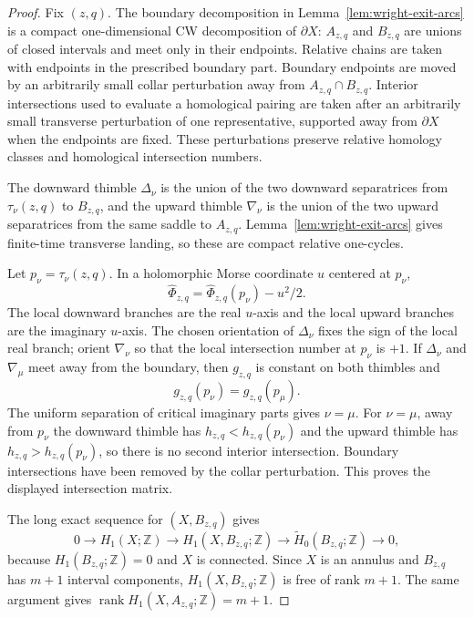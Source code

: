 \documentclass[reqno]{article}
\theoremstyle{definition}
\theoremstyle{remark}
\theoremstyle{plain}
\begin{document}
\begin{proof}
Fix $(z,q)$. The boundary decomposition in Lemma~\ref{lem:wright-exit-arcs} is a compact one-dimensional CW decomposition of $\partial X$: $A_{z,q}$ and $B_{z,q}$ are unions of closed intervals and meet only in their endpoints. Relative chains are taken with endpoints in the prescribed boundary part. Boundary endpoints are moved by an arbitrarily small collar perturbation away from $A_{z,q}\cap B_{z,q}$. Interior intersections used to evaluate a homological pairing are taken after an arbitrarily small transverse perturbation of one representative, supported away from $\partial X$ when the endpoints are fixed. These perturbations preserve relative homology classes and homological intersection numbers.

The downward thimble $\Delta_\nu$ is the union of the two downward separatrices from $\tau_\nu(z,q)$ to $B_{z,q}$, and the upward thimble $\nabla_\nu$ is the union of the two upward separatrices from the same saddle to $A_{z,q}$. Lemma~\ref{lem:wright-exit-arcs} gives finite-time transverse landing, so these are compact relative one-cycles.

Let $p_\nu=\tau_\nu(z,q)$. In a holomorphic Morse coordinate $u$ centered at $p_\nu$,
$$\widehat\Phi_{z,q}=\widehat\Phi_{z,q}(p_\nu)-u^2/2.$$
The local downward branches are the real $u$-axis and the local upward branches are the imaginary $u$-axis. The chosen orientation of $\Delta_\nu$ fixes the sign of the local real branch; orient $\nabla_\nu$ so that the local intersection number at $p_\nu$ is $+1$. If $\Delta_\nu$ and $\nabla_\mu$ meet away from the boundary, then $g_{z,q}$ is constant on both thimbles and
$$g_{z,q}(p_\nu)=g_{z,q}(p_\mu).$$
The uniform separation of critical imaginary parts gives $\nu=\mu$. For $\nu=\mu$, away from $p_\nu$ the downward thimble has $h_{z,q}<h_{z,q}(p_\nu)$ and the upward thimble has $h_{z,q}>h_{z,q}(p_\nu)$, so there is no second interior intersection. Boundary intersections have been removed by the collar perturbation. This proves the displayed intersection matrix.

The long exact sequence for $(X,B_{z,q})$ gives
$$0\to H_1(X;\mathbb Z)\to H_1(X,B_{z,q};\mathbb Z)
\to\widetilde H_0(B_{z,q};\mathbb Z)\to0,$$
because $H_1(B_{z,q};\mathbb Z)=0$ and $X$ is connected. Since $X$ is an annulus and $B_{z,q}$ has $m+1$ interval components, $H_1(X,B_{z,q};\mathbb Z)$ is free of rank $m+1$. The same argument gives $\operatorname{rank}H_1(X,A_{z,q};\mathbb Z)=m+1$.


\end{proof}
\end{document}
